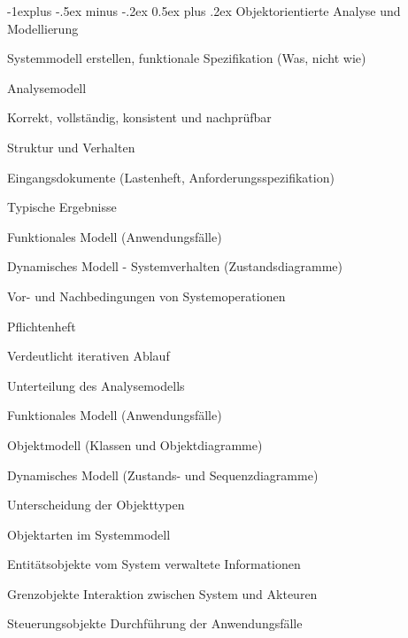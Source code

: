 \documentclass[a4paper]{article}
\makeatletter
\renewcommand{\subsection}{\@startsection{subsection}{2}{0mm}%
                                {-1explus -.5ex minus -.2ex}%
                                {0.5ex plus .2ex}%
                                {\normalfont\normalsize\bfseries}}
\makeatother
\begin{document}
\begin{multicols}{3}
  \subsection{Objektorientierte Analyse und Modellierung}
  \begin{itemize*}
    \item Systemmodell erstellen, funktionale Spezifikation (Was, nicht wie)
    \item Analysemodell
    \begin{itemize*}
      \item Korrekt, vollständig, konsistent und nachprüfbar
      \item Struktur und Verhalten
    \end{itemize*}
    \item Eingangsdokumente (Lastenheft, Anforderungsspezifikation)
    \item Typische Ergebnisse
    \begin{itemize*}
      \item Funktionales Modell (Anwendungsfälle)
      \item Dynamisches Modell - Systemverhalten (Zustandsdiagramme)
      \item Vor- und Nachbedingungen von Systemoperationen
      \item Pflichtenheft
    \end{itemize*}
    \item Verdeutlicht iterativen Ablauf
    \item Unterteilung des Analysemodells
    \begin{itemize*}
      \item Funktionales Modell (Anwendungsfälle)
      \item Objektmodell (Klassen und Objektdiagramme)
      \item Dynamisches Modell (Zustands- und Sequenzdiagramme)
      \item Unterscheidung der Objekttypen
    \end{itemize*}
    \item Objektarten im Systemmodell
    \begin{description*}
      \item[Entitätsobjekte] vom System verwaltete Informationen
      \item[Grenzobjekte] Interaktion zwischen System und Akteuren
      \item[Steuerungsobjekte] Durchführung der Anwendungsfälle

\end{description*}
\end{itemize*}
\end{multicols}
\end{document}
